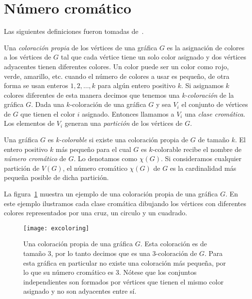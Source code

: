 \section{Número cromático}
Las siguientes definiciones fueron tomadas de~\cite{Chartrand2008}.

Una \emph{coloración propia} de los vértices de una gráfica $G$ es la asignación
de colores a los vértices de $G$ tal que cada vértice tiene un solo color
asignado y dos vértices adyacentes tienen diferentes colores.
Un color puede ser un color como rojo, verde, amarillo, etc. cuando el número
de colores a usar es pequeño, de otra forma se usan enteros $1,2,\dots,k$
para algún entero positivo $k$. Si asignamos $k$ colores
diferentes de esta manera decimos que tenemos una \emph{k-coloración} de la gráfica $G$.
Dada una $k$-coloración de una gráfica $G$ y sea $V_i$ el conjunto de vértices
de $G$ que tienen el color $i$ asignado. Entonces llamamos a $V_i$
una \emph{clase cromática}. Los elementos de $V_i$ generan una \emph{partición}
de los vértices de $G$.

Una gráfica $G$ es \emph{k-colorable} si existe una coloración propia de $G$ de tamaño $k$.
El entero positivo $k$ más pequeño para el cual $G$ es $k$-colorable recibe el nombre
de \emph{número cromático} de $G$. Lo denotamos como $\chi(G)$.
Si consideramos cualquier partición de $V(G)$, el número cromático $\chi(G)$ de $G$ es la
cardinalidad más pequeña posible de dicha partición.

La figura~\ref{fig:excoloring} muestra un ejemplo de una coloración propia de una gráfica $G$.
En este ejemplo ilustramos cada clase cromática dibujando los vértices con diferentes colores
representados por una cruz, un circulo y un cuadrado.
\begin{figure}[htpb]
  \centering
  \texttt{[image: excoloring]}
  \caption{Una coloración propia de una gráfica $G$. Esta coloración es de tamaño 3, por
  lo tanto decimos que es una 3-coloración de $G$. Para esta gráfica en particular
  no existe una coloración más pequeña, por lo que su número cromático es 3. Nótese
  que los conjuntos independientes son formados por vértices que tienen el mismo
  color asignado y no son adyacentes entre sí.}
  \label{fig:excoloring}
\end{figure}

